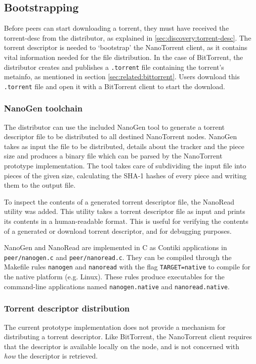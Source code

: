 \subsection{Bootstrapping}
Before peers can start downloading a torrent, they must have received the \gls{torrent-desc} from the distributor, as explained in \ref{sec:discovery:torrent-desc}. The torrent descriptor is needed to `bootstrap' the NanoTorrent client, as it contains vital information needed for the file distribution. In the case of BitTorrent, the distributor creates and publishes a \texttt{.torrent} file containing the torrent's metainfo, as mentioned in section \ref{sec:related:bittorrent}. Users download this \texttt{.torrent} file and open it with a BitTorrent client to start the download.

\subsubsection{NanoGen toolchain}
The distributor can use the included NanoGen tool to generate a torrent descriptor file to be distributed to all destined NanoTorrent nodes. NanoGen takes as input the file to be distributed, details about the tracker and the piece size and produces a binary file which can be parsed by the NanoTorrent prototype implementation. The tool takes care of subdividing the input file into pieces of the given size, calculating the SHA-1 hashes of every piece and writing them to the output file.

To inspect the contents of a generated torrent descriptor file, the NanoRead utility was added. This utility takes a torrent descriptor file as input and prints its contents in a human-readable format. This is useful for verifying the contents of a generated or download torrent descriptor, and for debugging purposes.

NanoGen and NanoRead are implemented in C as Contiki applications in \texttt{peer/nanogen.c} and \texttt{peer/nanoread.c}. They can be compiled through the Makefile rules \texttt{nanogen} and \texttt{nanoread} with the flag \texttt{TARGET=native} to compile for the native platform (e.g. Linux). These rules produce executables for the command-line applications named \texttt{nanogen.native} and \texttt{nanoread.native}.

\subsubsection{Torrent descriptor distribution}
The current prototype implementation does not provide a mechanism for distributing a torrent descriptor. Like BitTorrent, the NanoTorrent client requires that the descriptor is available locally on the node, and is not concerned with \emph{how} the descriptor is retrieved.

